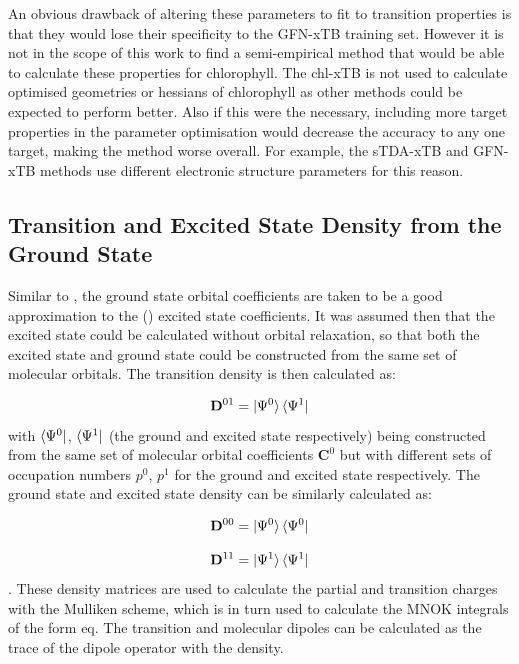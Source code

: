 An obvious drawback of altering these parameters to fit to transition properties
is that they would lose their specificity to the GFN-xTB training set. However
it is not in the scope of this work to find a semi-empirical method that would be able
to calculate these properties for chlorophyll. The chl-xTB is not used to calculate
optimised geometries or hessians of chlorophyll as other methods could be expected 
to perform better. Also if this were the necessary, including more target properties
in the parameter optimisation would decrease the accuracy to any one target, making
the method worse overall. For example, the sTDA-xTB and GFN-xTB methods use different
electronic structure parameters for this reason.

\subsection{Transition and Excited State Density from the Ground State}

Similar to \dscf, the ground state orbital coefficients are taken to be a good
approximation to the (\Qy) excited state coefficients. It was assumed then that
the excited state could be calculated without orbital relaxation, so that both the
excited state and ground state could be constructed from the same set of molecular
orbitals. The transition density is then calculated as:

\begin{equation}
\mathbf{D}^{01} = \ket{\Psi^0} \bra{\Psi^1} 
\end{equation}
%
with $\bra{\Psi^0}$, $\bra{\Psi^1}$ (the ground and excited state respectively)
being constructed from the same set of molecular orbital coefficients $\mathbf{C}^0$
but with different sets of occupation numbers $p^0$, $p^1$ for the ground and
excited state respectively. The ground state and excited state density can be
similarly calculated as:

\begin{equation}
\mathbf{D}^{00} = \ket{\Psi^0} \bra{\Psi^0}  
\end{equation}

\begin{equation}
\mathbf{D}^{11} = \ket{\Psi^1} \bra{\Psi^1}  
\end{equation}
%
. These density matrices are used to calculate the partial and transition charges
with the Mulliken scheme, which is in turn used to calculate the MNOK integrals of the form eq.
The transition and molecular dipoles can be calculated as the trace of the dipole operator with
the density.

